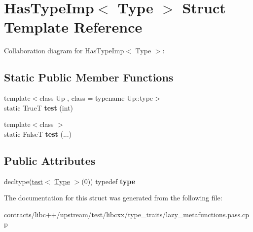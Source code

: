 \hypertarget{struct_has_type_imp}{}\section{Has\+Type\+Imp$<$ Type $>$ Struct Template Reference}
\label{struct_has_type_imp}


Collaboration diagram for Has\+Type\+Imp$<$ Type $>$\+:
\subsection*{Static Public Member Functions}
\begin{DoxyCompactItemize}
\item 
\mbox{\label{struct_has_type_imp_a752e76e4d7dc1b54a4362074cf748bc1}} 
{\footnotesize template$<$class Up , class  = typename Up\+::type$>$ }\\static TrueT {\bfseries test} (int)
\item 
\mbox{\label{struct_has_type_imp_acee3c10175e07c3bc7c4064bedf275be}} 
{\footnotesize template$<$class $>$ }\\static FalseT {\bfseries test} (...)
\end{DoxyCompactItemize}
\subsection*{Public Attributes}
\begin{DoxyCompactItemize}
\item 
\mbox{\label{struct_has_type_imp_a136ab75e8b631b0551ccb6d0c58f88f4}} 
decltype(\mbox{\hyperlink{structtest}{test}}$<$ \mbox{\hyperlink{struct_type}{Type}} $>$(0)) typedef {\bfseries type}
\end{DoxyCompactItemize}


The documentation for this struct was generated from the following file\+:\begin{DoxyCompactItemize}
\item 
contracts/libc++/upstream/test/libcxx/type\+\_\+traits/lazy\+\_\+metafunctions.\+pass.\+cpp\end{DoxyCompactItemize}
